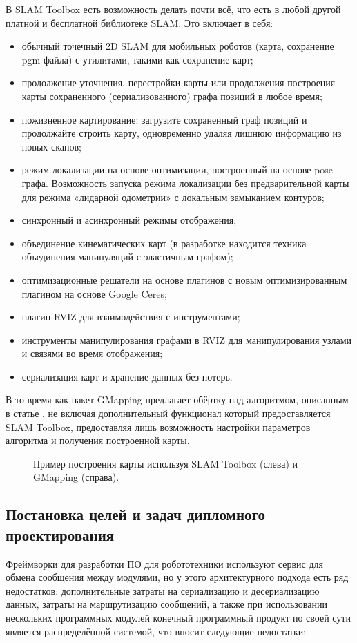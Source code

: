 В SLAM Toolbox есть возможность делать почти всё, что есть в любой другой
платной и бесплатной библиотеке SLAM. Это включает в себя:
\begin{itemize}
	\item обычный точечный 2D SLAM для мобильных роботов (карта,
		сохранение pgm-файла) с утилитами, такими как сохранение карт;
	\item продолжение уточнения, перестройки карты или продолжения построения
		карты сохраненного (сериализованного) графа позиций в любое время;
	\item пожизненное картирование: загрузите сохраненный граф позиций и
		продолжайте строить карту, одновременно удаляя лишнюю
		информацию из новых сканов;
	\item режим локализации на основе оптимизации, построенный на основе
		pose-графа. Возможность запуска режима локализации без предварительной
		карты для режима «лидарной одометрии» с локальным замыканием контуров;
	\item синхронный и асинхронный режимы отображения;
	\item объединение кинематических карт (в разработке находится техника
		объединения манипуляций с эластичным графом);
	\item оптимизационные решатели на основе плагинов с новым оптимизированным
		плагином на основе Google Ceres;
	\item плагин RVIZ для взаимодействия с инструментами;
	\item инструменты манипулирования графами в RVIZ для манипулирования узлами
		и связями во время отображения;
	\item сериализация карт и хранение данных без потерь.
\end{itemize}

В то время как пакет GMapping предлагает обёртку над алгоритмом,
описанным в статье \cite{grisetti2005improving}, не включая дополнительный
функционал который предоставляется SLAM Toolbox, предоставляя лишь возможность
настройки параметров алгоритма и получения построенной карты.

\begin{figure}[h]
	\caption{Пример построения карты используя SLAM Toolbox (слева) и GMapping
	(справа).}
\end{figure}

\subsection{Постановка целей и задач дипломного проектирования}
Фреймворки для разработки ПО для робототехники используют сервис для обмена
сообщения между модулями, но у этого архитектурного подхода есть ряд
недостатков: дополнительные затраты на сериализацию и десериализацию данных,
затраты на маршрутизацию сообщений, а также при использовании нескольких
программных модулей конечный программный продукт по своей сути является
распределённой системой, что вносит следующие недостатки:

